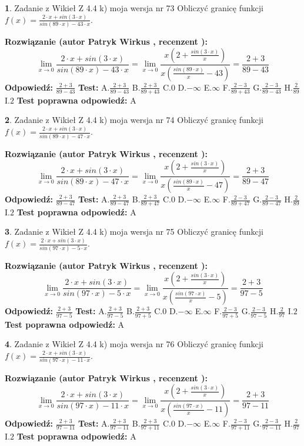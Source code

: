 \documentclass[12pt, a4paper]{article}
\theoremstyle{definition} %
\newtheorem{zad}{}
\newcommand{\zadStart}[1]{\begin{zad}#1\newline}
\newcommand{\zadStop}{\end{zad}}
\newcommand{\rozwStart}[2]{\noindent \textbf{Rozwiązanie (autor #1 , recenzent #2): }\newline}
\newcommand{\rozwStop}{\newline}
\newcommand{\odpStart}{\noindent \textbf{Odpowiedź:}\newline}
\newcommand{\odpStop}{\newline}
\newcommand{\testStart}{\noindent \textbf{Test:}\newline}
\newcommand{\testStop}{\newline}
\newcommand{\kluczStart}{\noindent \textbf{Test poprawna odpowiedź:}\newline}
\newcommand{\kluczStop}{\newline}
\begin{document}
\zadStart{Zadanie z Wikieł Z 4.4 k) moja wersja nr 73}
Obliczyć granicę funkcji $f(x)=\frac{2\cdot x +sin(3\cdot x)}{sin(89\cdot x) -43\cdot x}$.
\zadStop
\rozwStart{Patryk Wirkus}{}
$$\lim\limits_{x\to 0}\frac{2\cdot x +sin(3\cdot x)}{sin(89\cdot x) -43\cdot x}
=\lim\limits_{x\to 0}\frac{x(2+\frac{sin(3\cdot x)}{x})}{x(\frac{sin(89\cdot x)}{x}-43)}
=\frac{2+3}{89-43}$$
\rozwStop
\odpStart
$\frac{2+3}{89-43}$
\odpStop
\testStart
A.$\frac{2+3}{89-43}$
B.$\frac{2+3}{89+43}$
C.$0$
D.$-\infty$
E.$\infty$
F.$\frac{2-3}{89+43}$
G.$\frac{2-3}{89-43}$
H.$\frac{2}{89}$
I.$2$
\testStop
\kluczStart
A
\kluczStop



\zadStart{Zadanie z Wikieł Z 4.4 k) moja wersja nr 74}
Obliczyć granicę funkcji $f(x)=\frac{2\cdot x +sin(3\cdot x)}{sin(89\cdot x) -47\cdot x}$.
\zadStop
\rozwStart{Patryk Wirkus}{}
$$\lim\limits_{x\to 0}\frac{2\cdot x +sin(3\cdot x)}{sin(89\cdot x) -47\cdot x}
=\lim\limits_{x\to 0}\frac{x(2+\frac{sin(3\cdot x)}{x})}{x(\frac{sin(89\cdot x)}{x}-47)}
=\frac{2+3}{89-47}$$
\rozwStop
\odpStart
$\frac{2+3}{89-47}$
\odpStop
\testStart
A.$\frac{2+3}{89-47}$
B.$\frac{2+3}{89+47}$
C.$0$
D.$-\infty$
E.$\infty$
F.$\frac{2-3}{89+47}$
G.$\frac{2-3}{89-47}$
H.$\frac{2}{89}$
I.$2$
\testStop
\kluczStart
A
\kluczStop



\zadStart{Zadanie z Wikieł Z 4.4 k) moja wersja nr 75}
Obliczyć granicę funkcji $f(x)=\frac{2\cdot x +sin(3\cdot x)}{sin(97\cdot x) -5\cdot x}$.
\zadStop
\rozwStart{Patryk Wirkus}{}
$$\lim\limits_{x\to 0}\frac{2\cdot x +sin(3\cdot x)}{sin(97\cdot x) -5\cdot x}
=\lim\limits_{x\to 0}\frac{x(2+\frac{sin(3\cdot x)}{x})}{x(\frac{sin(97\cdot x)}{x}-5)}
=\frac{2+3}{97-5}$$
\rozwStop
\odpStart
$\frac{2+3}{97-5}$
\odpStop
\testStart
A.$\frac{2+3}{97-5}$
B.$\frac{2+3}{97+5}$
C.$0$
D.$-\infty$
E.$\infty$
F.$\frac{2-3}{97+5}$
G.$\frac{2-3}{97-5}$
H.$\frac{2}{97}$
I.$2$
\testStop
\kluczStart
A
\kluczStop



\zadStart{Zadanie z Wikieł Z 4.4 k) moja wersja nr 76}
Obliczyć granicę funkcji $f(x)=\frac{2\cdot x +sin(3\cdot x)}{sin(97\cdot x) -11\cdot x}$.
\zadStop
\rozwStart{Patryk Wirkus}{}
$$\lim\limits_{x\to 0}\frac{2\cdot x +sin(3\cdot x)}{sin(97\cdot x) -11\cdot x}
=\lim\limits_{x\to 0}\frac{x(2+\frac{sin(3\cdot x)}{x})}{x(\frac{sin(97\cdot x)}{x}-11)}
=\frac{2+3}{97-11}$$
\rozwStop
\odpStart
$\frac{2+3}{97-11}$
\odpStop
\testStart
A.$\frac{2+3}{97-11}$
B.$\frac{2+3}{97+11}$
C.$0$
D.$-\infty$
E.$\infty$
F.$\frac{2-3}{97+11}$
G.$\frac{2-3}{97-11}$
H.$\frac{2}{97}$
I.$2$
\testStop
\kluczStart
A
\kluczStop
\end{document}

